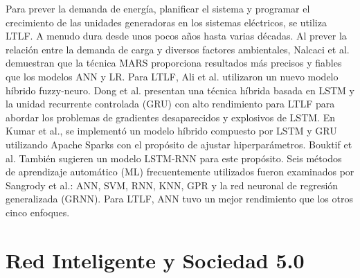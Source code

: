 \documentclass[crop=false]{standalone}
\begin{document}
Para prever la demanda de energía, planificar el sistema y programar el crecimiento de las unidades generadoras en los sistemas eléctricos, se utiliza LTLF. A menudo dura desde unos pocos años hasta varias décadas.
Al prever la relación entre la demanda de carga y diversos factores ambientales, Nalcaci et al. demuestran que la técnica MARS proporciona resultados más precisos y fiables que los modelos ANN y LR. Para LTLF, Ali et al. utilizaron un nuevo modelo híbrido fuzzy-neuro. Dong et al. presentan una técnica híbrida basada en LSTM y la unidad recurrente controlada (GRU) con alto rendimiento para LTLF para abordar los problemas de gradientes desaparecidos y explosivos de LSTM. En Kumar et al., se implementó un modelo híbrido compuesto por LSTM y GRU utilizando Apache Sparks con el propósito de ajustar hiperparámetros. Bouktif et al. También sugieren un modelo LSTM-RNN para este propósito. Seis métodos de aprendizaje automático (ML) frecuentemente utilizados fueron examinados por Sangrody et al.: ANN, SVM, RNN, KNN, GPR y la red neuronal de regresión generalizada (GRNN). Para LTLF, ANN tuvo un mejor rendimiento que los otros cinco enfoques.

\section{Red Inteligente y Sociedad 5.0}
\end{document}
